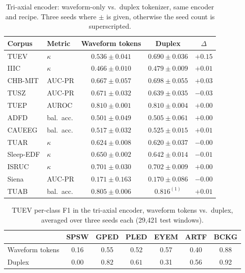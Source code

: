 \begin{table}[h]
\centering
\small
\caption{Tri-axial encoder: waveform-only vs.\ duplex tokenizer, same
encoder and recipe. Three seeds where $\pm$ is given, otherwise the seed
count is superscripted.}
\label{tab:coupling-triaxial}
\begin{tabular}{llccc}
\toprule
Corpus & Metric & Waveform tokens & Duplex & $\Delta$ \\
\midrule
TUEV & $\kappa$ & $0.536 \pm 0.041$ & $0.690 \pm 0.036$ & $+0.15$ \\
IIIC & $\kappa$ & $0.466 \pm 0.010$ & $0.479 \pm 0.009$ & $+0.01$ \\
CHB-MIT & AUC-PR & $0.667 \pm 0.057$ & $0.698 \pm 0.055$ & $+0.03$ \\
TUSZ & AUC-PR & $0.671 \pm 0.032$ & $0.639 \pm 0.035$ & $-0.03$ \\
TUEP & AUROC & $0.810 \pm 0.001$ & $0.810 \pm 0.004$ & $+0.00$ \\
ADFD & bal.\ acc. & $0.501 \pm 0.049$ & $0.505 \pm 0.061$ & $+0.00$ \\
CAUEEG & bal.\ acc. & $0.517 \pm 0.032$ & $0.525 \pm 0.015$ & $+0.01$ \\
TUAR & $\kappa$ & $0.624 \pm 0.008$ & $0.620 \pm 0.037$ & $-0.00$ \\
Sleep-EDF & $\kappa$ & $0.650 \pm 0.002$ & $0.642 \pm 0.014$ & $-0.01$ \\
ISRUC & $\kappa$ & $0.701 \pm 0.030$ & $0.702 \pm 0.009$ & $+0.00$ \\
Siena & AUC-PR & $0.171 \pm 0.163$ & $0.170 \pm 0.086$ & $-0.00$ \\
TUAB & bal.\ acc. & $0.805 \pm 0.006$ & $0.816^{(1)}$ & $+0.01$ \\
\bottomrule
\end{tabular}
\end{table}

\begin{table}[h]
\centering
\small
\caption{TUEV per-class F1 in the tri-axial encoder, waveform tokens vs.\
duplex, averaged over three seeds each (29,421 test windows).}
\label{tab:perclass-triaxial}
\begin{tabular}{lcccccc}
\toprule
 & SPSW & GPED & PLED & EYEM & ARTF & BCKG \\
\midrule
Waveform tokens & 0.16 & 0.55 & 0.52 & 0.57 & 0.40 & 0.88 \\
Duplex & 0.00 & $\mathbf{0.82}$ & $\mathbf{0.61}$ & 0.31 & 0.56 & 0.92 \\
\bottomrule
\end{tabular}
\end{table}

